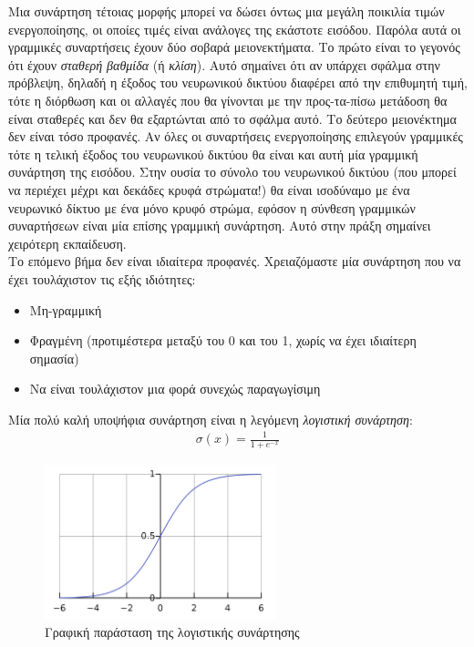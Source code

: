 \documentclass[11pt]{article} %
\begin{document}
Μια συνάρτηση τέτοιας μορφής μπορεί να δώσει όντως μια μεγάλη ποικιλία τιμών ενεργοποίησης, οι οποίες τιμές είναι ανάλογες της εκάστοτε εισόδου. Παρόλα αυτά οι γραμμικές συναρτήσεις έχουν δύο σοβαρά μειονεκτήματα. Το πρώτο είναι το γεγονός ότι έχουν \textit{σταθερή βαθμίδα} (ή \textit{κλίση}). Αυτό σημαίνει ότι αν υπάρχει σφάλμα στην πρόβλεψη, δηλαδή η έξοδος του νευρωνικού δικτύου διαφέρει από την επιθυμητή τιμή, τότε η διόρθωση και οι αλλαγές που θα γίνονται με την προς-τα-πίσω μετάδοση θα είναι σταθερές και δεν θα εξαρτώνται από το σφάλμα αυτό. Το δεύτερο μειονέκτημα δεν είναι τόσο προφανές. Αν όλες οι συναρτήσεις ενεργοποίησης επιλεγούν γραμμικές τότε η τελική έξοδος του νευρωνικού δικτύου θα είναι και αυτή μία γραμμική συνάρτηση της εισόδου. Στην ουσία το σύνολο του νευρωνικού δικτύου (που μπορεί να περιέχει μέχρι και δεκάδες κρυφά στρώματα!) θα είναι ισοδύναμο με ένα νευρωνικό δίκτυο με ένα μόνο κρυφό στρώμα, εφόσον η σύνθεση γραμμικών συναρτήσεων είναι μία επίσης γραμμική συνάρτηση. Αυτό στην πράξη σημαίνει χειρότερη εκπαίδευση.\\

Το επόμενο βήμα δεν είναι ιδιαίτερα προφανές. Χρειαζόμαστε μία συνάρτηση που να έχει τουλάχιστον τις εξής ιδιότητες:
\begin{itemize}
  \item Μη-γραμμική
  \item Φραγμένη (προτιμέστερα μεταξύ του 0 και του 1, χωρίς να έχει ιδιαίτερη σημασία)
  \item Να είναι τουλάχιστον μια φορά συνεχώς παραγωγίσιμη 
\end{itemize}

Μία πολύ καλή υποψήφια συνάρτηση είναι η λεγόμενη \textit{λογιστική συνάρτηση}:
\begin{align*}
\sigma(x) = \frac{1}{1+e^{-x}}
\end{align*}

\begin{figure}[h]
    \centering
    \includegraphics[width=0.6\textwidth]{logcurve}
    \caption{Γραφική παράσταση της λογιστικής συνάρτησης}
    \label{fig:logistic curve}
\end{figure}
\end{document}
